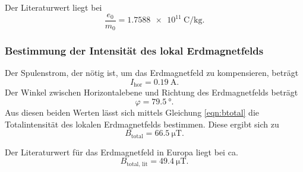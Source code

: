 \noindent Der Literaturwert liegt bei 
\begin{equation*}
    \frac{e_0}{m_0} = \SI{1.7588e11}{\coulomb\per\kilo\gram}.
\end{equation*}

\subsubsection{Bestimmung der Intensität des lokal Erdmagnetfelds}
Der Spulenstrom, der nötig ist, um das Erdmagnetfeld zu
kompensieren, beträgt
\begin{equation*}
    I_\text{hor} = \SI{0.19}{\ampere}.
\end{equation*}
Der Winkel zwischen Horizontalebene und Richtung des Erdmagnetfelds
beträgt
\begin{equation*}
    \varphi = \SI{79.5}{\degree}.
\end{equation*}
Aus diesen beiden Werten lässt sich mittels Gleichung \eqref{eqn:btotal}
die Totalintensität des lokalen Erdmagnetfelds bestimmen.
Diese ergibt sich zu
\begin{equation*}
    B_\text{total} = \SI{66.5}{\micro\tesla}.
\end{equation*}

\noindent Der Literaturwert für das Erdmagnetfeld in Europa \cite{btotal} liegt bei ca.
\begin{equation*}
    B_\text{total, lit} = \SI{49.4}{\micro\tesla}.
\end{equation*} %
